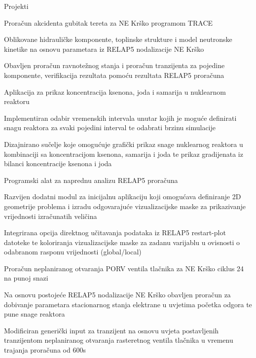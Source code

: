 \documentclass{resume} %
\begin{document}
\begin{rSection}{Projekti}

\begin{rSubsection}{Prora\v{c}un akcidenta gubitak tereta za NE Kr\v{s}ko programom TRACE}{}{}{}
\item Oblikovane hidrauli\v{c}ke komponente, toplinske strukture i model neutronske kinetike na osnovu parametara iz RELAP5 nodalizacije NE Kr\v{s}ko
\item Obavljen prora\v{c}un ravnote\v{z}nog stanja i prora\v{c}un tranzijenta za pojedine komponente, verifikacija rezultata pomo\'{c}u rezultata RELAP5 prora\v{c}una
\end{rSubsection}

\begin{rSubsection}{Aplikacija za prikaz koncentracija ksenona, joda i samarija u nuklearnom reaktoru}{}{}{}
\item Implementiran odabir vremenskih intervala unutar kojih je mogu\'{c}e definirati snagu reaktora za svaki pojedini interval te odabrati brzinu simulacije 
\item Dizajnirano su\v{c}elje koje omogu\'{c}uje grafi\v{c}ki prikaz snage nuklearnog reaktora u kombinaciji sa koncentracijom ksenona, samarija i joda te prikaz gradijenata iz bilanci koncentracije ksenona i joda
\end{rSubsection}

\begin{rSubsection}{Programski alat za naprednu analizu RELAP5 prora\v{c}una}{}{}{}
\item Razvijen dodatni modul za inicijalnu aplikaciju koji omogu\'{c}ava definiranje 2D geometrije problema i izradu odgovaraju\'{c}e vizualizacijske maske za prikazivanje vrijednosti izra\v{c}unatih veli\v{c}ina
\item Integrirana opcija direktnog u\v{c}itavanja podataka iz RELAP5 restart-plot datoteke te koloriranja vizualizacijske maske za zadanu varijablu u ovisnosti o odabranom rasponu vrijednosti (global/local)
\end{rSubsection}

\begin{rSubsection}{Prora\v{c}un neplaniranog otvaranja PORV ventila tla\v{c}nika za NE Kr\v{s}ko ciklus 24 na punoj snazi}{}{}{}
\item Na osnovu postoje\'{c}e RELAP5 nodalizacije NE Kr\v{s}ko obavljen prora\v{c}un za dobivanje parametara stacionarnog stanja elektrane u uvjetima po\v{c}etka odgora te pune snage reaktora
\item Modificiran generi\v{c}ki input za tranzijent na osnovu uvjeta postavljenih tranzijentom neplaniranog otvaranja rasteretnog ventila tla\v{c}nika u vremenu trajanja prora\v{c}una od 600s
\end{rSubsection}

\end{rSection}
\end{document}
